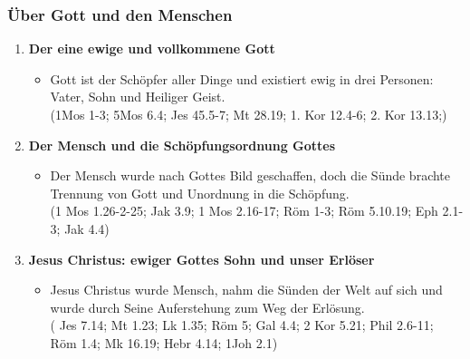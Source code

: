 \documentclass[aspectratio=43]{beamer}
\begin{document}
\begin{frame}
    \frametitle{Über Gott und den Menschen}  %
    \vspace{0.80cm}
    \begin{enumerate}
        \item \textbf{Der eine ewige und vollkommene Gott}
            \begin{itemize}              
                \item Gott ist der Schöpfer aller Dinge und existiert ewig in drei Personen: Vater, Sohn und Heiliger Geist.\\
                (1Mos 1-3; 5Mos 6.4; Jes 45.5-7; Mt 28.19; 1. Kor 12.4-6; 2. Kor 13.13;)                
            \end{itemize}            
            \vspace{0.20cm}
        \item \textbf{Der Mensch und die Schöpfungsordnung Gottes}
            \begin{itemize}
                \item Der Mensch wurde nach Gottes Bild geschaffen, doch die Sünde brachte Trennung von Gott und Unordnung in die Schöpfung.\\
                (1 Mos 1.26-2-25; Jak 3.9; 1 Mos 2.16-17; Röm 1-3; Röm 5.10.19; Eph 2.1-3; Jak 4.4)
            \end{itemize}            
            \vspace{0.20cm}
        \item \textbf{Jesus Christus: ewiger Gottes Sohn und unser Erlöser}
            \begin{itemize}
                \item Jesus Christus wurde Mensch, nahm die Sünden der Welt auf sich und wurde durch Seine Auferstehung zum Weg der Erlösung.\\
                ( Jes 7.14; Mt 1.23; Lk 1.35; Röm 5; Gal 4.4; 2 Kor 5.21; Phil 2.6-11; Röm 1.4; Mk 16.19; Hebr 4.14; 1Joh 2.1)
            \end{itemize}              
    \end{enumerate}   
\end{frame}
\end{document}

